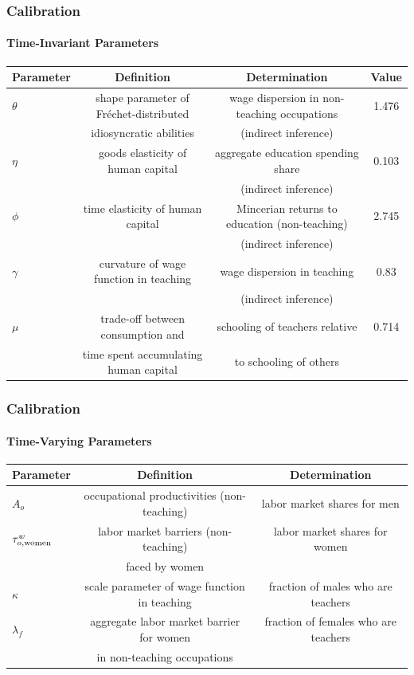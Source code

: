 \documentclass[11pt]{beamer}
\begin{document}
\begin{frame}
	\frametitle{Calibration}
	\framesubtitle{Time-Invariant Parameters}
	\tiny
	\begin{table}[h!]
		\centering
		\begin{tabular}{lccc}
			\toprule
			Parameter & Definition & Determination & Value\\
			\midrule
			$\theta$ & shape parameter of Fr\'echet-distributed & wage dispersion in non-teaching occupations & 1.476\\
			& idiosyncratic abilities & (indirect inference) &\\
			$\eta$ & goods elasticity of human capital & aggregate education spending share  & 0.103\\
			& & (indirect inference) &\\
			$\phi$ & time elasticity of human capital & Mincerian returns to education (non-teaching) & 2.745\\
			& & (indirect inference) &\\
			$\gamma$ & curvature of wage function in teaching & wage dispersion in teaching & 0.83\\
			&& (indirect inference) &\\
			$\mu$ &  trade-off between consumption and & schooling of teachers relative & 0.714\\
			& time spent accumulating human capital & to schooling of others & \\
			\bottomrule
		\end{tabular}
		\label{tab:param}
	\end{table}
\end{frame}

\begin{frame}
	\frametitle{Calibration}
		\framesubtitle{Time-Varying Parameters}
	\tiny
	\begin{table}[h!]
		\centering
		\begin{tabular}{lcc}
			\toprule
			Parameter & Definition & Determination \\
			\midrule			
			$A_{o}$ & occupational productivities (non-teaching) & labor market shares for men  \\
			$\tau^{w}_{o,{\rm women}}$ & labor market barriers (non-teaching) & labor market shares for women \\
			& faced by women & \\
			$\kappa$ & scale parameter of wage function in teaching & fraction of males who are teachers \\
			$\lambda_f$ & aggregate labor market barrier for women & fraction of females who are teachers \\
			& in non-teaching occupations & \\
			\bottomrule
		\end{tabular}
		\label{tab:param_time}
	\end{table}
\end{frame}
\end{document}
